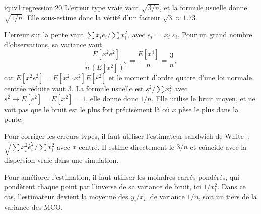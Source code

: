\begin{solution}{iq:iv1:regression:20}
L'erreur type vraie vaut $\sqrt{3/n}$, et la formule usuelle donne $\sqrt{1/n}$. Elle sous-estime donc la vérité d'un facteur $\sqrt3 \approx 1.73$.

L'erreur sur la pente vaut $\sum x_i e_i / \sum x_i^2$, avec $e_i = |x_i|\varepsilon_i$. Pour un grand nombre d'observations, sa variance vaut
\[
\frac{E[x^2 e^2]}{n\,(E[x^2])^2} = \frac{E[x^4]}{n} = \frac{3}{n} ,
\]
car $E[x^2 e^2] = E[x^2 \cdot x^2]E[\varepsilon^2]$ et le moment d'ordre quatre d'une loi normale centrée réduite vaut 3. La formule usuelle est $s^2/\sum x_i^2$ avec $s^2 \to E[e^2] = E[x^2] = 1$, elle donne donc $1/n$. Elle utilise le bruit moyen, et ne voit pas que le bruit est le plus fort précisément là où $x$ pèse le plus dans la pente.

Pour corriger les erreurs types, il faut utiliser l'estimateur sandwich de White~: $\sqrt{\sum x_i^2 \hat e_i^2}/\sum x_i^2$ avec $x$ centré. Il estime directement le $3/n$ et coïncide avec la dispersion vraie dans une simulation.

Pour améliorer l'estimation, il faut utiliser les moindres carrés pondérés, qui pondèrent chaque point par l'inverse de sa variance de bruit, ici $1/x_i^2$. Dans ce cas, l'estimateur devient la moyenne des $y_i/x_i$, de variance $1/n$, soit un tiers de la variance des MCO.

\end{solution}

